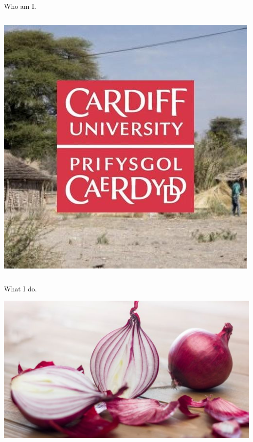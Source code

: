 \documentclass{beamer}
\begin{document}
\begin{frame}{Who am I.}
\begin{columns}[T]
\begin{column}{.2\textwidth}
  		\includegraphics[width=\textwidth]{static/phoenix-logo.jpg}
\end{column}%
\end{columns}
\end{frame}

\begin{frame}{What I do.}
    \begin{center}
        \includegraphics[width=.80\textwidth]{static/onion.jpg}
    \end{center}
\end{frame}
\end{document}
